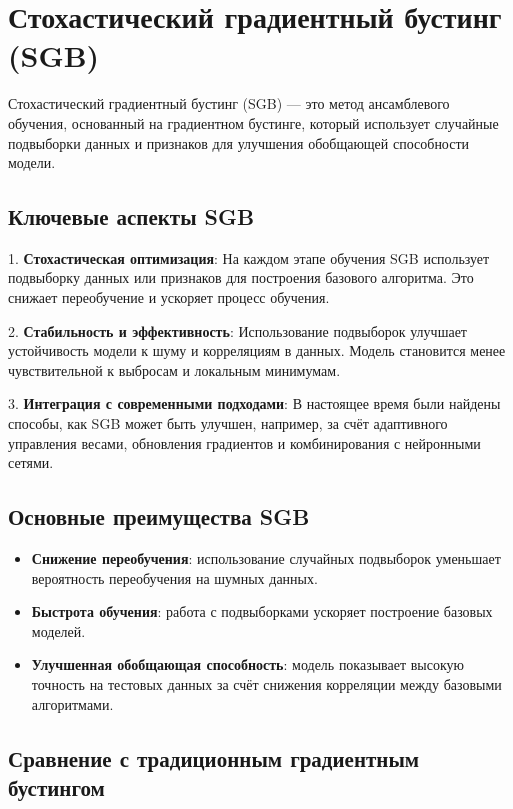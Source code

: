 \section{Стохастический градиентный бустинг (SGB)}

Стохастический градиентный бустинг (SGB) — это метод ансамблевого обучения, основанный на градиентном бустинге, который использует случайные подвыборки данных и признаков для улучшения обобщающей способности модели. 

\subsection{Ключевые аспекты SGB}

1. \textbf{Стохастическая оптимизация}:
   На каждом этапе обучения SGB использует подвыборку данных или признаков для построения базового алгоритма. Это снижает переобучение и ускоряет процесс обучения.

2. \textbf{Стабильность и эффективность}:
   Использование подвыборок улучшает устойчивость модели к шуму и корреляциям в данных. Модель становится менее чувствительной к выбросам и локальным минимумам.

3. \textbf{Интеграция с современными подходами}:
   В настоящее время были найдены способы, как SGB может быть улучшен, например, за счёт адаптивного управления весами, обновления градиентов и комбинирования с нейронными сетями.

\subsection{Основные преимущества SGB}

\begin{itemize}
    \item \textbf{Снижение переобучения}: использование случайных подвыборок уменьшает вероятность переобучения на шумных данных.
    \item \textbf{Быстрота обучения}: работа с подвыборками ускоряет построение базовых моделей.
    \item \textbf{Улучшенная обобщающая способность}: модель показывает высокую точность на тестовых данных за счёт снижения корреляции между базовыми алгоритмами.
\end{itemize}

\subsection{Сравнение с традиционным градиентным бустингом}

